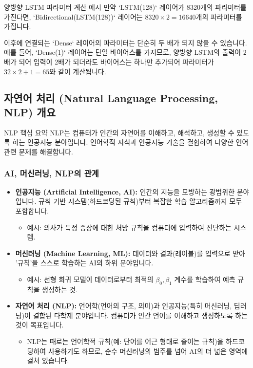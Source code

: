 \documentclass[11pt,a4paper]{article}
\begin{document}
\begin{examplebox}{양방향 LSTM 파라미터 계산 예시}
만약 `LSTM(128)` 레이어가 8320개의 파라미터를 가진다면, `Bidirectional(LSTM(128))` 레이어는 $8320 \times 2 = 16640$개의 파라미터를 가집니다.

이후에 연결되는 `Dense` 레이어의 파라미터는 단순히 두 배가 되지 않을 수 있습니다. 예를 들어, `Dense(1)` 레이어는 단일 바이어스를 가지므로, 양방향 LSTM의 출력이 2배가 되어 입력이 2배가 되더라도 바이어스는 하나만 추가되어 파라미터가 $32 \times 2 + 1 = 65$와 같이 계산됩니다.
\end{examplebox}

\subsection{자연어 처리 (Natural Language Processing, NLP) 개요}
\begin{summarybox}{NLP 핵심 요약}
NLP는 컴퓨터가 인간의 자연어를 이해하고, 해석하고, 생성할 수 있도록 하는 인공지능 분야입니다. 언어학적 지식과 인공지능 기술을 결합하여 다양한 언어 관련 문제를 해결합니다.
\end{summarybox}

\subsubsection{AI, 머신러닝, NLP의 관계}
\begin{itemize}
    \item \textbf{인공지능 (Artificial Intelligence, AI):} 인간의 지능을 모방하는 광범위한 분야입니다. 규칙 기반 시스템(하드코딩된 규칙)부터 복잡한 학습 알고리즘까지 모두 포함합니다.
        \begin{itemize}
            \item 예시: 의사가 특정 증상에 대한 처방 규칙을 컴퓨터에 입력하여 진단하는 시스템.
        \end{itemize}
    \item \textbf{머신러닝 (Machine Learning, ML):} 데이터와 결과(레이블)를 입력으로 받아 '규칙'을 스스로 학습하는 AI의 하위 분야입니다.
        \begin{itemize}
            \item 예시: 선형 회귀 모델이 데이터로부터 최적의 $\beta_0, \beta_1$ 계수를 학습하여 예측 규칙을 생성하는 것.
        \end{itemize}
    \item \textbf{자연어 처리 (NLP):} 언어학(언어의 구조, 의미)과 인공지능(특히 머신러닝, 딥러닝)이 결합된 다학제 분야입니다. 컴퓨터가 인간 언어를 이해하고 생성하도록 하는 것이 목표입니다.
        \begin{itemize}
            \item NLP는 때로는 언어학적 규칙(예: 단어를 어근 형태로 줄이는 규칙)을 하드코딩하여 사용하기도 하므로, 순수 머신러닝의 범주를 넘어 AI의 더 넓은 영역에 걸쳐 있습니다.
        \end{itemize}
\end{itemize}
\end{document}
